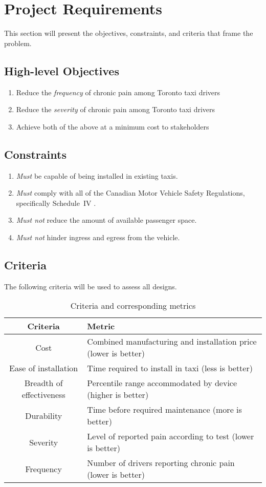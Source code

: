 \documentclass[11pt]{article}
\begin{document}
\section{Project Requirements}
\label{sec:requirements}
This section will present the objectives, constraints, and criteria 
that frame the problem.

\subsection{High-level Objectives}
\label{sec:high-level-objectives}

\begin{enumerate}
\item Reduce the \emph{frequency} of chronic pain among Toronto taxi drivers
\item Reduce the \emph{severity} of chronic pain among Toronto taxi drivers
\item Achieve both of the above at a minimum cost to stakeholders
\end{enumerate}

\subsection{Constraints}
\begin{enumerate}
\item \emph{Must} be capable of being installed in existing taxis.
\item \emph{Must} comply with all of the Canadian Motor Vehicle Safety Regulations,
specifically Schedule~IV \cite{motorregs}.
\item \emph{Must not} reduce the amount of available passenger space.
\item \emph{Must not} hinder ingress and egress from the vehicle.
\end{enumerate}
\subsection{Criteria}
The following criteria will be used to assess all designs.
\begin{table}[h]
\centering
\caption{Criteria and corresponding metrics}
\begin{tabular}{c p{10cm} }
  Criteria & Metric \\ \hline
  Cost & Combined manufacturing and installation price (lower is better) \\
  Ease of installation & Time required to install in taxi (less is better) \\
  Breadth of effectiveness & Percentile range accommodated by device (higher is better) \\
  Durability & Time before required maintenance (more is better) \\
  Severity & Level of reported pain according to test (lower is better) \\
  Frequency & Number of drivers reporting chronic pain (lower is better)
\end{tabular}
\end{table}
\end{document}
